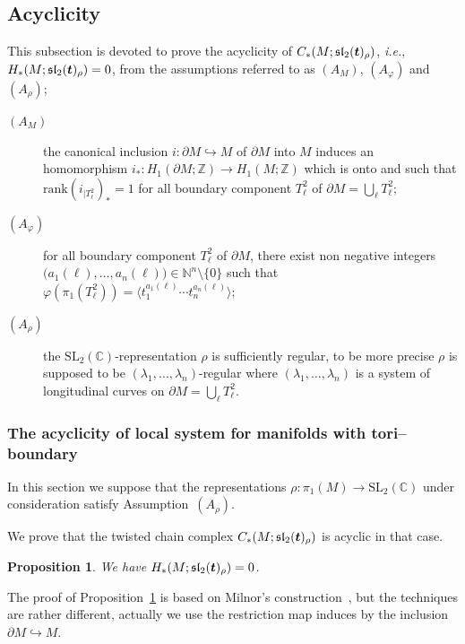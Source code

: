 \documentclass[a4paper]{amsart}
\theoremstyle{plain}
\newtheorem{proposition}[theorem]{Proposition}%
\theoremstyle{definition}
\theoremstyle{remark}
\newcommand{\ie}{\emph{i.e.}}
\newcommand{\ZZ}{{\mathbb Z}}
\newcommand{\CC}{{\mathbb C}}
\newcommand{\NN}{{\mathbb N}}
\newcommand{\SL}{{\mathrm{SL}_2(\CC)}}
\newcommand{\bm}[1]{\mbox{\boldmath $#1$}}
\newcommand{\sllmt}{\mathfrak{sl}_2(\bm{t})}
\begin{document}
\subsection{Acyclicity}
\label{section:acyclicity_complex}

This subsection is devoted to prove the acyclicity of
$C_*(M;\sllmt_\rho)$, \ie, $H_*(M;\sllmt_\rho) = 0$, from the 
assumptions referred to as $(A_M)$, $(A_\varphi)$ and $(A_\rho)$;
\begin{description}
\item[$(A_M)$] the canonical inclusion $i\colon \partial M \hookrightarrow M$ of
  $\partial M$ into $M$ induces an homomorphism
  $i_*\colon H_1(\partial M; \ZZ) \to H_1(M; \ZZ)$ which is onto and
  such that $\mathrm{rank} (i_{|T^2_\ell})_* = 1$ for all boundary
  component $T^2_\ell$ of $\partial M = \bigcup_\ell T^2_\ell$;
\item[$(A_\varphi)$] for all boundary component $T^2_\ell$ of $\partial M$,
  there exist non negative integers $\big(a_1(\ell), \ldots, a_n(\ell)\big) \in \NN^n\setminus\{0\}$
  such that 
  $\varphi(\pi_1(T^2_\ell)) = \langle t_1^{a_1(\ell)} \cdots t_n^{a_n(\ell)} \rangle;$ 
\item[$(A_\rho)$] the $\SL$-representation $\rho$ is sufficiently regular,
  to be more precise $\rho$ is supposed to be $(\lambda_1, \ldots, \lambda_n)$-regular
  where $(\lambda_1, \ldots, \lambda_n)$ is a system of longitudinal curves
  on $\partial M = \bigcup_\ell T^2_\ell$.
\end{description}

\subsubsection{The acyclicity of local system for manifolds with tori--boundary}
\label{section:acyclicity_boundary}

In this section we suppose that the representations $\rho\colon
\pi_1(M) \to \SL$ under consideration satisfy Assumption~$(A_\rho)$.

We prove that the twisted chain complex $C_*(M; \sllmt_\rho)$ is
acyclic in that case.


\begin{proposition}\label{prop:acyclic}
  We have $H_*(M; \sllmt_\rho) = 0$.
\end{proposition}

The proof of Proposition~\ref{prop:acyclic} is based on Milnor's
construction~\cite{Milnor:1968}, but the techniques are rather different,
actually we use the restriction map induces by the inclusion $\partial M \hookrightarrow M$.
\end{document}
